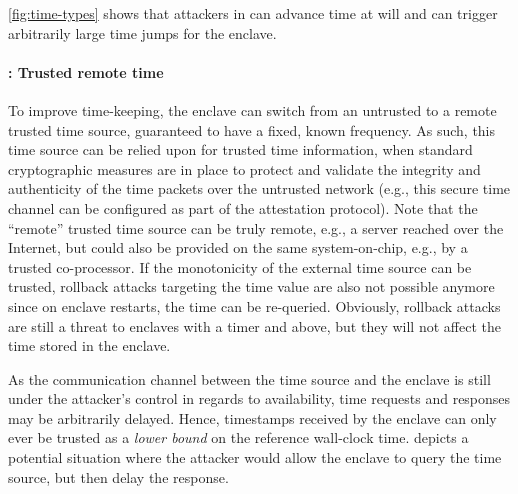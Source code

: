 \documentclass[sigplan,10pt]{acmart}
\begin{document}
\cref{fig:time-types} shows that attackers in \Tone{} can advance time at will
and can trigger arbitrarily large time jumps for the enclave.

\paragraph{\Ttwo: Trusted remote time}
To improve time-keeping, the enclave can switch from an untrusted to a remote
trusted time source, guaranteed to have a fixed, known frequency. As such, this
time source can be relied upon for trusted time information, when standard
cryptographic measures are in place to protect and validate the integrity and
authenticity of the time packets over the untrusted network (e.g., this secure
time channel can be configured as part of the attestation protocol). Note that
the ``remote'' trusted time source can be truly remote, e.g., a server reached
over the Internet, but could also be provided on the same system-on-chip, e.g., by a trusted co-processor.
If the monotonicity of the external time source can be trusted, rollback attacks targeting the time value are also not possible anymore since on enclave restarts, the time can be re-queried.
Obviously, rollback attacks are still a threat to enclaves with a \Ttwo{} timer and above, but they will not affect the time stored in the enclave.

As the communication channel between the time source and the enclave is still
under the attacker's control in regards to availability, \Ttwo{} time requests
and responses may be arbitrarily delayed. Hence, \Ttwo{} timestamps received by
the enclave can only ever be trusted as a \emph{lower bound} on the reference
wall-clock time.  depicts a potential situation where the
attacker would allow the enclave to query the time source, but then delay the
response.

\end{document}
